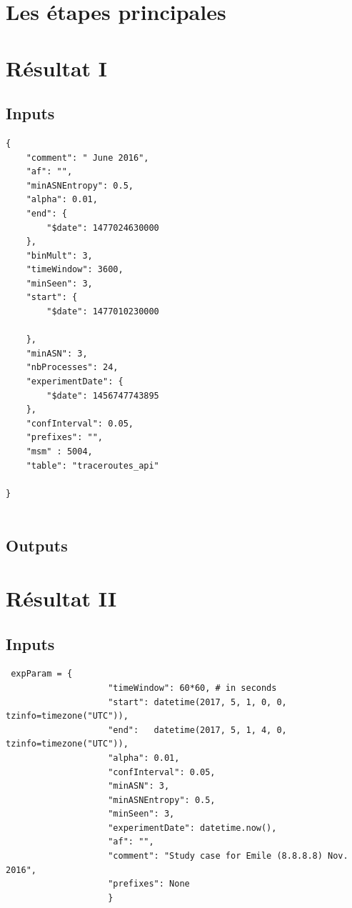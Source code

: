 \documentclass[]{report}
\title{}
\author{}
\begin{document}
\maketitle


\section{Les étapes principales}

\section{Résultat I}
\subsection{Inputs}
\begin{verbatim}
{
	"comment": " June 2016", 
	"af": "", 
	"minASNEntropy": 0.5, 
	"alpha": 0.01, 
	"end": {
		"$date": 1477024630000
	}, 
	"binMult": 3, 
	"timeWindow": 3600,
	"minSeen": 3, 
	"start": {
		"$date": 1477010230000
		
	}, 
	"minASN": 3, 
	"nbProcesses": 24, 
	"experimentDate": {
		"$date": 1456747743895
	}, 
	"confInterval": 0.05,
	"prefixes": "",
	"msm" : 5004,
	"table": "traceroutes_api"
	
}


\end{verbatim}
\subsection{Outputs}

\section{Résultat II}
\subsection{Inputs}

\begin{verbatim}
 expParam = {
					"timeWindow": 60*60, # in seconds 
					"start": datetime(2017, 5, 1, 0, 0, tzinfo=timezone("UTC")),
					"end":   datetime(2017, 5, 1, 4, 0, tzinfo=timezone("UTC")),
					"alpha": 0.01, 
					"confInterval": 0.05,
					"minASN": 3,
					"minASNEntropy": 0.5,
					"minSeen": 3,
					"experimentDate": datetime.now(),
					"af": "",
					"comment": "Study case for Emile (8.8.8.8) Nov. 2016",
					"prefixes": None
					}
\end{verbatim}
\end{document}

